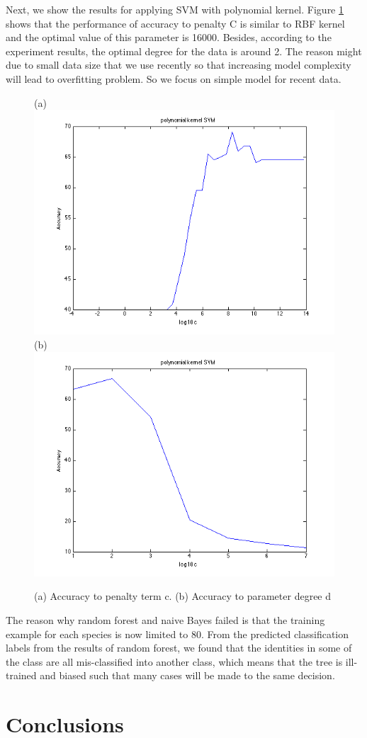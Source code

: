 \documentclass{article} %
\begin{document}
Next, we show the results for applying SVM with polynomial kernel. Figure \ref{fig:poly} shows that the performance of accuracy to penalty C is similar to RBF kernel and the optimal value of this parameter is 16000. Besides, according to the experiment results, the optimal degree for the data is around 2. The reason might due to small data size that we use recently so that increasing model complexity will lead to overfitting problem. So we focus on simple model for recent data.

\begin{figure}[ht!]
    \centering
    {(a)\includegraphics[width=0.38\linewidth]{../Figure/Poly_cost_accuracy}
    (b)\includegraphics[width=0.38\linewidth]{../Figure/Poly_degree_accuracy}}
    \caption{(a) Accuracy to penalty term c. (b) Accuracy to parameter degree d}
    \label{fig:poly}
\end{figure}

The reason why random forest and naive Bayes failed is that the training example for each species is now limited to 80. From the predicted classification labels from the results of random forest, we found that the identities in some of the class are all mis-classified into another class, which means that the tree is ill-trained and biased such that many cases will be made to the same decision.



\section{Conclusions}





\end{document}
